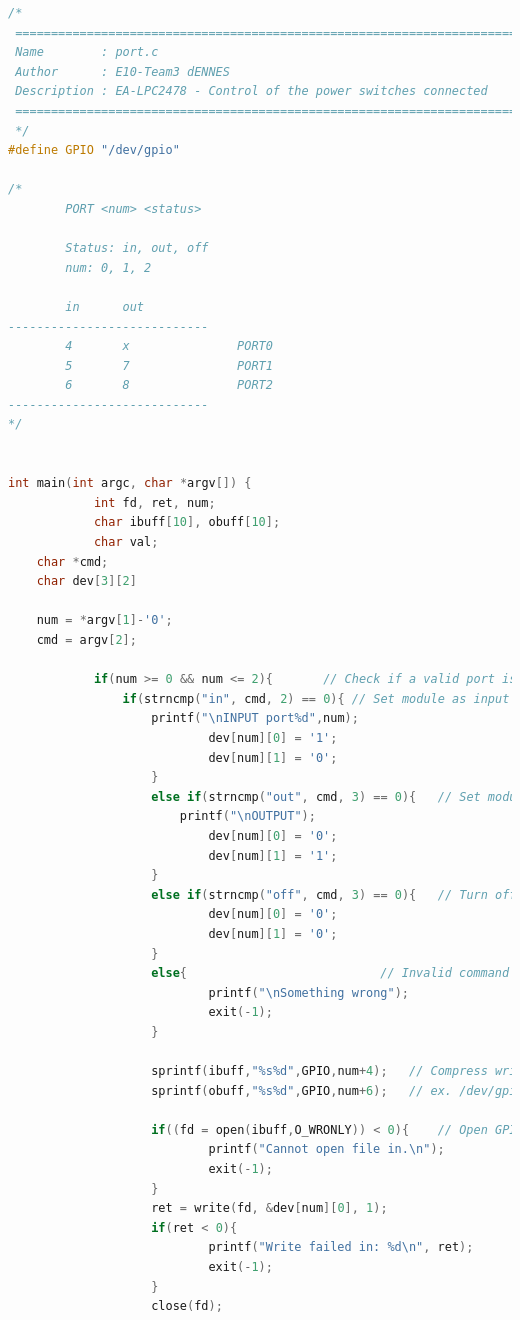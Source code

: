 \begin{lstlisting}[language=c, caption=User space application to control the Power switches]
/*
 ============================================================================
 Name        : port.c
 Author      : E10-Team3 dENNES
 Description : EA-LPC2478 - Control of the power switches connected
 ============================================================================
 */
#define GPIO "/dev/gpio"

/*
        PORT <num> <status>

        Status: in, out, off
        num: 0, 1, 2
        
        in      out
----------------------------
        4       x               PORT0
        5       7               PORT1
        6       8               PORT2
----------------------------
*/


int main(int argc, char *argv[]) {
        	int fd, ret, num;
        	char ibuff[10], obuff[10];
        	char val;	
	char *cmd;
	char dev[3][2]

	num = *argv[1]-'0';
	cmd = argv[2];

        	if(num >= 0 && num <= 2){		// Check if a valid port is called
         		if(strncmp("in", cmd, 2) == 0){	// Set module as input
                   	printf("\nINPUT port%d",num);
                        	dev[num][0] = '1';
                        	dev[num][1] = '0';
                	}
                	else if(strncmp("out", cmd, 3) == 0){	// Set module as output
                       	printf("\nOUTPUT");
                        	dev[num][0] = '0';
                        	dev[num][1] = '1';
                	}
                	else if(strncmp("off", cmd, 3) == 0){	// Turn off module in both directions
                        	dev[num][0] = '0';
                        	dev[num][1] = '0';
                	}
                	else{							// Invalid command sent
                        	printf("\nSomething wrong");
                        	exit(-1);
                	}

                	sprintf(ibuff,"%s%d",GPIO,num+4);	// Compress write string
                	sprintf(obuff,"%s%d",GPIO,num+6);	// ex. /dev/gpio4 if PORT0

                	if((fd = open(ibuff,O_WRONLY)) < 0){	// Open GPIO device driver
                        	printf("Cannot open file in.\n");
                        	exit(-1);
                	}
                	ret = write(fd, &dev[num][0], 1);
                	if(ret < 0){
                        	printf("Write failed in: %d\n", ret);
                        	exit(-1);
                	}
                	close(fd);


\end{lstlisting}
